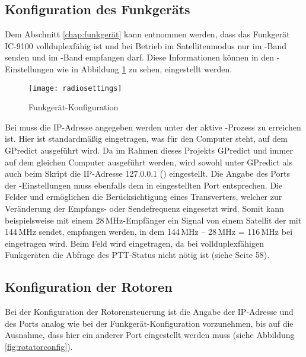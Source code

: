 \subsection{Konfiguration des Funkgeräts}
\label{chap:radioconfig}

Dem Abschnitt \ref{chap:funkgerät} kann entnommen werden, dass das Funkgerät IC-9100 vollduplexfähig ist und bei Betrieb im Satellitenmodus nur im -Band senden und im -Band empfangen darf. Diese Informationen können in den -Einstellungen wie in Abbildung \ref{fig:radioconfig} zu sehen, eingestellt werden. 

\begin{figure}[h]
	\centering
	\texttt{[image: radiosettings]}
	\caption{Funkgerät-Konfiguration}
	\label{fig:radioconfig} 
\end{figure}

\newpage

Bei  muss die IP-Adresse angegeben werden unter der aktive -Prozess zu erreichen ist. Hier ist standardmäßig  eingetragen, was für den Computer steht, auf dem GPredict ausgeführt wird. Da im Rahmen dieses Projekts GPredict und  immer auf dem gleichen Computer ausgeführt werden, wird sowohl unter GPredict als auch beim Skript  die IP-Adresse 127.0.0.1 () eingestellt. Die Angabe des Ports der -Einstellungen muss ebenfalls dem in  eingestellten Port entsprechen. Die Felder  und  ermöglichen die Berücksichtigung eines Transverters, welcher zur Veränderung der Empfangs- oder Sendefrequenz eingesetzt wird. Somit kann beispielsweise mit einem 28\,MHz-Empfänger ein Signal von einem Satellit der mit 144\,MHz sendet, empfangen werden, in dem 144\,MHz -- 28\,MHz = 116\,MHz bei  eingetragen wird. Beim Feld  wird  eingetragen, da bei vollduplexfähigen Funkgeräten die Abfrage des \ac{PTT}-Status nicht nötig ist (siehe \cite{gpredictmanual} Seite 58).

\subsection{Konfiguration der Rotoren}
\label{chap:rotatorconfig}	

Bei der Konfiguration der Rotorensteuerung ist die Angabe der IP-Adresse und des Ports analog wie bei der Funkgerät-Konfiguration vorzunehmen, bis auf die Ausnahme, dass hier ein anderer Port eingestellt werden muss (siehe Abbildung \ref{fig:rotatorconfig}). 

